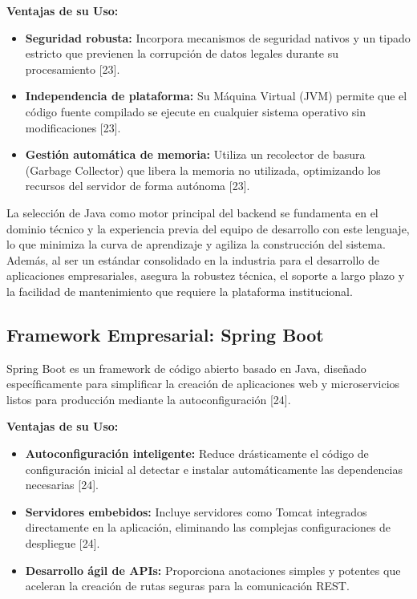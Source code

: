 \textbf{Ventajas de su Uso:}
\begin{itemize}
    \item \textbf{Seguridad robusta:} Incorpora mecanismos de seguridad nativos y un tipado estricto que previenen la corrupción de datos legales durante su procesamiento [23].
    \item \textbf{Independencia de plataforma:} Su Máquina Virtual (JVM) permite que el código fuente compilado se ejecute en cualquier sistema operativo sin modificaciones [23].
    \item \textbf{Gestión automática de memoria:} Utiliza un recolector de basura (Garbage Collector) que libera la memoria no utilizada, optimizando los recursos del servidor de forma autónoma [23].
\end{itemize}

La selección de Java como motor principal del backend se fundamenta en el dominio técnico y la experiencia previa del equipo de desarrollo con este lenguaje, lo que minimiza la curva de aprendizaje y agiliza la construcción del sistema. Además, al ser un estándar consolidado en la industria para el desarrollo de aplicaciones empresariales, asegura la robustez técnica, el soporte a largo plazo y la facilidad de mantenimiento que requiere la plataforma institucional.

\subsection{Framework Empresarial: Spring Boot}
Spring Boot es un framework de código abierto basado en Java, diseñado específicamente para simplificar la creación de aplicaciones web y microservicios listos para producción mediante la autoconfiguración [24].

\textbf{Ventajas de su Uso:}
\begin{itemize}
    \item \textbf{Autoconfiguración inteligente:} Reduce drásticamente el código de configuración inicial al detectar e instalar automáticamente las dependencias necesarias [24].
    \item \textbf{Servidores embebidos:} Incluye servidores como Tomcat integrados directamente en la aplicación, eliminando las complejas configuraciones de despliegue [24].
    \item \textbf{Desarrollo ágil de APIs:} Proporciona anotaciones simples y potentes que aceleran la creación de rutas seguras para la comunicación REST.
\end{itemize}

